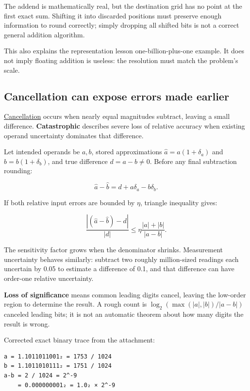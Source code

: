 The addend is mathematically real, but the destination grid has no point at the first exact sum. Shifting it into discarded positions must preserve enough information to round correctly; simply dropping all shifted bits is not a correct general addition algorithm.

This also explains the representation lesson one-billion-plus-one example. It does not imply floating addition is useless: the resolution must match the problem's scale.

\subsection{Cancellation can expose errors made earlier}\label{01-foundations-i-ch001-cancellation-can-expose-errors-made-earlier}

\hyperref[appendix-a2773a6a2f9d]{Cancellation} occurs when nearly equal magnitudes subtract, leaving a small difference. \textbf{Catastrophic} describes severe loss of relative accuracy when existing operand uncertainty dominates that difference.

Let intended operands be \(a,b\), stored approximations \(\widehat a=a(1+\delta_a)\) and \(\widehat b=b(1+\delta_b)\), and true difference \(d=a-b\ne0\). Before any final subtraction rounding:

\[
\widehat a-\widehat b=d+a\delta_a-b\delta_b.
\]

If both relative input errors are bounded by \(\eta\), triangle inequality gives:

\[
\frac{|(\widehat a-\widehat b)-d|}{|d|}
\le\eta\frac{|a|+|b|}{|a-b|}.
\]

The sensitivity factor grows when the denominator shrinks. Measurement uncertainty behaves similarly: subtract two roughly million-sized readings each uncertain by 0.05 to estimate a difference of 0.1, and that difference can have order-one relative uncertainty.

\textbf{Loss of significance} means common leading digits cancel, leaving the low-order region to determine the result. A rough count is \(\log_2(\max(|a|,|b|)/|a-b|)\) canceled leading bits; it is not an automatic theorem about how many digits the result is wrong.

Corrected exact binary trace from the attachment:

\begin{verbatim}
a = 1.1011011001₂ = 1753 / 1024
b = 1.1011010111₂ = 1751 / 1024
a-b = 2 / 1024 = 2^-9
    = 0.000000001₂ = 1.0₂ × 2^-9
\end{verbatim}


